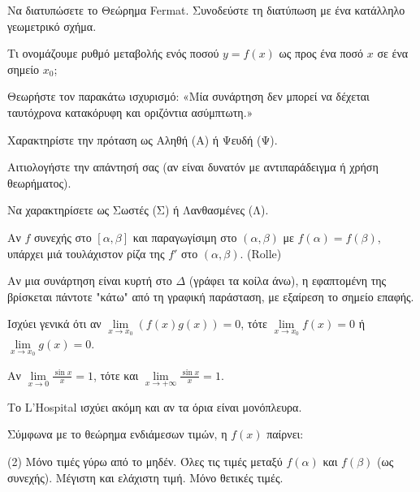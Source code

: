 \documentclass[11pt,a4paper]{article}
\newcommand{\kerkissans}[1]{{\fontfamily{maksf}\selectfont \textbf{#1}}}
\renewcommand{\textdexiakeraia}{}
\newcommand\themanum{A}
\newcounter{thema}[section]
\renewcommand{\thethema}{\arabic{thema}}
\newcommand{\Thema}{\refstepcounter{thema}{\textbf{\textcolor{black}{\faPenSquare\ \  \large \kerkissans{\textbf{\thethemaο\hspace{2mm}Διαγώνισμα - Θέμα \themanum}}}}}\hspace{0mm}}{}
\newenvironment{thema}[1]
{\begin{tcolorbox}[title=\Thema\kerkissans{\textbf{\large{  #1}}},breakable,
enhanced standard,titlerule=0pt,toprule=0pt, rightrule=0pt, bottomrule=0pt,
colback=white,left=0mm,top=1mm,bottom=0mm,
boxrule=0pt,
colframe=white,leftrule=0mm,sharp corners,coltitle=black]
\renewcommand{\themanum}{#1}}
{\end{tcolorbox}}
\begin{document}
\begin{thema}{A}
\begin{erwthma}
    \item Να διατυπώσετε το Θεώρημα Fermat. Συνοδεύστε τη διατύπωση με ένα κατάλληλο γεωμετρικό σχήμα.
    \item Τι ονομάζουμε ρυθμό μεταβολής ενός ποσού $y=f(x)$ ως προς ένα ποσό $x$ σε ένα σημείο $x_0$;
    \item Θεωρήστε τον παρακάτω ισχυρισμό:
    «Μία συνάρτηση δεν μπορεί να δέχεται ταυτόχρονα κατακόρυφη και οριζόντια ασύμπτωτη.»
    \begin{alist}
    \item Χαρακτηρίστε την πρόταση ως Αληθή (Α) ή Ψευδή (Ψ).
    \item Αιτιολογήστε την απάντησή σας (αν είναι δυνατόν με αντιπαράδειγμα ή χρήση θεωρήματος).
    \end{alist}
    \item Να χαρακτηρίσετε ως Σωστές (Σ) ή Λανθασμένες (Λ).
    \begin{alist}
        \item Αν $f$ συνεχής στο $[\alpha, \beta]$ και παραγωγίσιμη στο $(\alpha, \beta)$ με $f(\alpha)=f(\beta)$, υπάρχει μιά τουλάχιστον ρίζα της $f'$ στο $(\alpha, \beta)$. (Rolle)
        \item Αν μια συνάρτηση είναι κυρτή στο $\Delta$ (γράφει τα κοίλα άνω), η εφαπτομένη της βρίσκεται πάντοτε "κάτω" από τη γραφική παράσταση, με εξαίρεση το σημείο επαφής.
        \item Ισχύει γενικά ότι αν $\lim\limits_{x\to x_0} (f(x)g(x)) = 0$, τότε $\lim\limits_{x\to x_0} f(x) = 0$ ή $\lim\limits_{x\to x_0} g(x) = 0$.
        \item Αν $\lim\limits_{x \to 0} \frac{\sin x}{x} = 1$, τότε και $\lim\limits_{x \to +\infty} \frac{\sin x}{x} = 1$.
        \item Το L'Hospital ισχύει ακόμη και αν τα όρια είναι μονόπλευρα.
    \end{alist}
    \item Σύμφωνα με το θεώρημα ενδιάμεσων τιμών, η $f(x)$ παίρνει:
    \begin{tasks}[label=\let\textdexiakeraia\relax\alph*.](2)
        \task Μόνο τιμές γύρω από το μηδέν.
        \task Όλες τις τιμές μεταξύ $f(\alpha)$ και $f(\beta)$ (ως συνεχής).
        \task Μέγιστη και ελάχιστη τιμή.
        \task Μόνο θετικές τιμές.
    \end{tasks}
\end{erwthma}
\end{thema}
\vspace{1cm}
\end{document}
